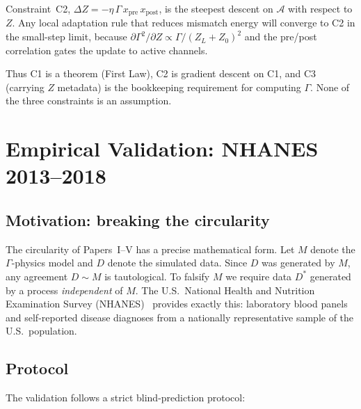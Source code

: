 \documentclass[aps,pre,twocolumn,superscriptaddress,floatfix]{revtex4-2}
\begin{document}
Constraint~C2, $\Delta Z=-\eta\,\Gamma\,x_{\text{pre}}\,
x_{\text{post}}$, is the steepest descent on $\mathcal{A}$
with respect to $Z$.  Any local adaptation rule that
reduces mismatch energy will converge to C2 in the
small-step limit, because $\partial\Gamma^2/\partial Z
\propto \Gamma/(Z_L+Z_0)^2$ and the pre/post correlation
gates the update to active channels.

Thus C1 is a theorem (First Law), C2 is gradient descent
on C1, and C3 (carrying $Z$ metadata) is the bookkeeping
requirement for computing $\Gamma$.
None of the three constraints is an assumption.


\section{Empirical Validation: NHANES 2013--2018}
\label{sec:nhanes}

\subsection{Motivation: breaking the circularity}

The circularity of Papers~I--V has a precise mathematical
form.  Let $M$ denote the $\Gamma$-physics model and $D$
denote the simulated data.  Since $D$ was generated by $M$,
any agreement $D \sim M$ is tautological.
To falsify $M$ we require data $D^*$ generated by a process
\emph{independent} of $M$.  The U.S.\ National Health and
Nutrition Examination Survey (NHANES)~\cite{NHANES2018}
provides exactly this: laboratory blood panels and
self-reported disease diagnoses from a nationally
representative sample of the U.S.\ population.

\subsection{Protocol}

The validation follows a strict blind-prediction protocol:
\end{document}
